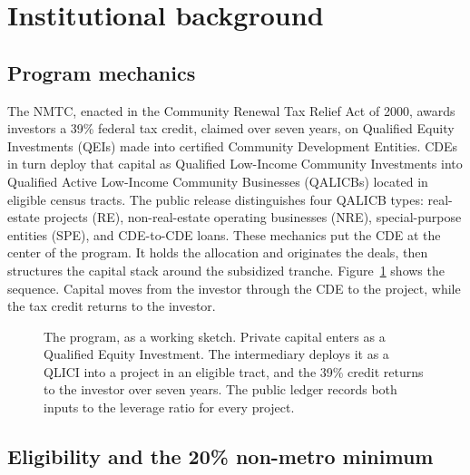 \section{Institutional background}\label{sec:background}

\subsection{Program mechanics}

The NMTC, enacted in the Community Renewal Tax Relief Act of 2000, awards
investors a 39\% federal tax credit, claimed over seven years, on Qualified
Equity Investments (QEIs) made into certified Community Development
Entities. CDEs in turn deploy that capital as Qualified Low-Income
Community Investments into Qualified Active Low-Income Community
Businesses (QALICBs) located in eligible census tracts. The public release
distinguishes four QALICB types: real-estate projects (RE), non-real-estate
operating businesses (NRE), special-purpose entities (SPE), and
CDE-to-CDE loans. These mechanics put the CDE at the center of the program.
It holds the allocation and originates the deals, then structures the
capital stack around the subsidized tranche. Figure~\ref{fig:mechanics}
shows the sequence. Capital moves from the investor through the CDE to the
project, while the tax credit returns to the investor.

\begin{figure}[t]
\centering
\resizebox{\textwidth}{!}{}
\caption{The program, as a working sketch. Private capital enters as a
Qualified Equity Investment. The intermediary deploys it as a QLICI into a
project in an eligible tract, and the 39\% credit returns to the investor
over seven years. The public ledger records both inputs to the leverage
ratio for every project.}
\label{fig:mechanics}
\end{figure}

\subsection{Eligibility and the 20\% non-metro minimum}

